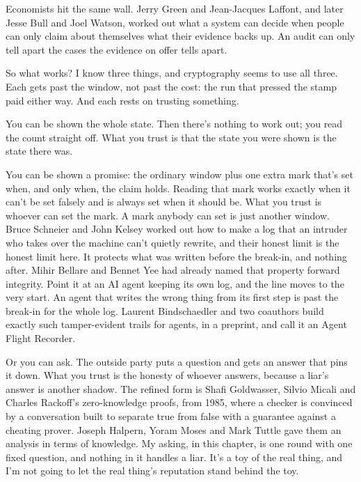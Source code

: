 \documentclass[11pt,twoside]{article}
\theoremstyle{thielethm}
\theoremstyle{thieledef}
\theoremstyle{thieledef}
\theoremstyle{thieledef}
\theoremstyle{thielethm}
\theoremstyle{thieleobs}
\theoremstyle{thielethm}
\begin{document}
Economists hit the same wall. Jerry Green and Jean-Jacques Laffont, and later Jesse Bull and Joel Watson, worked out what a system can decide when people can only claim about themselves what their evidence backs up. An audit can only tell apart the cases the evidence on offer tells apart.

So what works? I know three things, and cryptography seems to use all three. Each gets past the window, not past the cost: the run that pressed the stamp paid either way. And each rests on trusting something.

You can be shown the whole state. Then there's nothing to work out; you read the count straight off. What you trust is that the state you were shown is the state there was.

You can be shown a promise: the ordinary window plus one extra mark that's set when, and only when, the claim holds. Reading that mark works exactly when it can't be set falsely and is always set when it should be. What you trust is whoever can set the mark. A mark anybody can set is just another window. Bruce Schneier and John Kelsey worked out how to make a log that an intruder who takes over the machine can't quietly rewrite, and their honest limit is the honest limit here. It protects what was written before the break-in, and nothing after. Mihir Bellare and Bennet Yee had already named that property forward integrity. Point it at an AI agent keeping its own log, and the line moves to the very start. An agent that writes the wrong thing from its first step is past the break-in for the whole log. Laurent Bindschaedler and two coauthors build exactly such tamper-evident trails for agents, in a preprint, and call it an Agent Flight Recorder.

Or you can ask. The outside party puts a question and gets an answer that pins it down. What you trust is the honesty of whoever answers, because a liar's answer is another shadow. The refined form is Shafi Goldwasser, Silvio Micali and Charles Rackoff's zero-knowledge proofs, from 1985, where a checker is convinced by a conversation built to separate true from false with a guarantee against a cheating prover. Joseph Halpern, Yoram Moses and Mark Tuttle gave them an analysis in terms of knowledge. My asking, in this chapter, is one round with one fixed question, and nothing in it handles a liar. It's a toy of the real thing, and I'm not going to let the real thing's reputation stand behind the toy.
\end{document}
